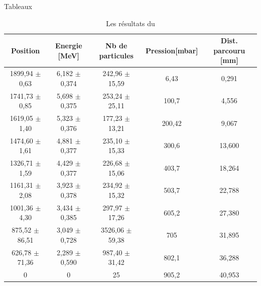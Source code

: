 \documentclass[a4paper,11pt,liststotocnumbered,bibtotocnumbered]{scrartcl}
\begin{document}
\begin{appendix}
\begin{section}{Tableaux}
   
   \begin{table}[H]
    \begin{center}
     \begin{tabular}{c|c|c|c|c}
      Position			&Energie [MeV]		&Nb de particules	&Pression[mbar]		&Dist. parcouru [mm]\\ \hline
      1899,94 $\pm$ 0,63	&6,182 $\pm$ 0,374	&242,96 $\pm$ 15,59	&6,43	&0,291\\
      1741,73 $\pm$ 0,85	&5,698 $\pm$ 0,375	&253,24 $\pm$ 25,11	&100,7	&4,556\\
      1619,05 $\pm$ 1,40	&5,323 $\pm$ 0,376	&177,23 $\pm$ 13,21	&200,42	&9,067\\
      1474,60 $\pm$ 1,61	&4,881 $\pm$ 0,377	&235,10 $\pm$ 15,33	&300,6	&13,600\\
      1326,71 $\pm$ 1,59	&4,429 $\pm$ 0,377	&226,68 $\pm$ 15,06	&403,7	&18,264\\
      1161,31 $\pm$ 2,08	&3,923 $\pm$ 0,378	&234,92 $\pm$ 15,32	&503,7	&22,788\\
      1001,36 $\pm$ 4,30	&3,434 $\pm$ 0,385	&297,97 $\pm$ 17,26	&605,2	&27,380\\
      875,52 $\pm$ 86,51	&3,049 $\pm$ 0,728	&3526,06 $\pm$ 59,38	&705	&31,895\\
      626,78 $\pm$ 71,36	&2,289 $\pm$ 0,590	&987,40 $\pm$ 31,42	&802,1	&36,288\\
      0				&0			&25			&905,2	&40,953
     \end{tabular}
    \caption{\label{tabelle-bi} Les résultats du  }
    \end{center}
   \end{table}
 

\end{section}
\end{appendix}
\end{document}
